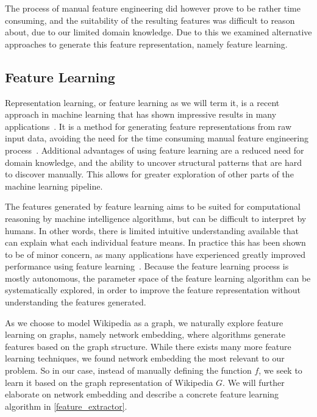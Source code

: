 The process of manual feature engineering did however prove to be rather time consuming, and the suitability of the resulting features was difficult to reason about, due to our limited domain knowledge. Due to this we examined alternative approaches to generate this feature representation, namely feature learning.


\subsection{Feature Learning}
Representation learning, or feature learning as we will term it,  is a recent approach in machine learning that has shown impressive results in many applications~\cite{bengio2013representation}. It is a method for generating feature representations from raw input data, avoiding the need for the time consuming manual feature engineering process~\cite{ng-lecture}. Additional advantages of using feature learning are a reduced need for domain knowledge, and the ability to uncover structural patterns that are hard to discover manually. This allows for greater exploration of other parts of the machine learning pipeline.

The features generated by feature learning aims to be suited for computational reasoning by machine intelligence algorithms, but can be difficult to interpret by humans. In other words, there is limited intuitive understanding available that can explain what each individual feature means. In practice this has been shown to be of minor concern, as many applications have experienced greatly improved performance using feature learning~\cite{bengio2013representation}. Because the feature learning process is mostly autonomous, the parameter space of the feature learning algorithm can be systematically explored, in order to improve the feature representation without understanding the features generated. 

As we choose to model Wikipedia as a graph, we naturally explore feature learning on graphs, namely network embedding, where algorithms generate features based on the graph structure.  While there exists many more feature learning techniques, we found network embedding the most relevant to our problem. So in our case, instead of manually defining the function $f$, we seek to learn it based on the graph representation of Wikipedia $G$. We will further elaborate on network embedding and describe a concrete feature learning algorithm in \cref{feature_extractor}.


